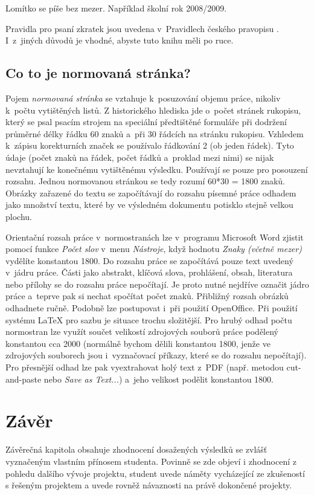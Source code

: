 Lomítko se píše bez mezer. Například školní rok 2008/2009.

Pravidla pro psaní zkratek jsou uvedena v~Pravidlech českého pravopisu \cite{Pravidla}. I~z~jiných důvodů je vhodné, abyste tuto knihu měli po ruce. 


\section{Co to je normovaná stránka?}
Pojem {\it normovaná stránka} se vztahuje k~posuzování objemu práce, nikoliv k~počtu vytištěných listů. Z historického hlediska jde o~počet stránek rukopisu, který se psal psacím strojem na speciální předtištěné formuláře při dodržení průměrné délky řádku 60 znaků a~při 30 řádcích na stránku rukopisu. Vzhledem k~zápisu korekturních značek se používalo řádkování 2 (ob jeden řádek). Tyto údaje (počet znaků na řádek, počet řádků a~proklad mezi nimi) se nijak nevztahují ke konečnému vytištěnému výsledku. Používají se pouze pro posouzení rozsahu. Jednou normovanou stránkou se tedy rozumí 60*30 = 1800 znaků. Obrázky zařazené do textu se započítávají do rozsahu písemné práce odhadem jako množství textu, které by ve výsledném dokumentu potisklo stejně velkou plochu.

Orientační rozsah práce v~normostranách lze v~programu Microsoft Word zjistit pomocí funkce {\it Počet slov} v~menu {\it Nástroje}, když hodnotu {\it Znaky (včetně mezer)} vydělíte konstantou 1800. Do rozsahu práce se započítává pouze text uvedený v~jádru práce. Části jako abstrakt, klíčová slova, prohlášení, obsah, literatura nebo přílohy se do rozsahu práce nepočítají. Je proto nutné nejdříve označit jádro práce a~teprve pak si nechat spočítat počet znaků. Přibližný rozsah obrázků odhadnete ručně. Podobně lze postupovat i~při použití OpenOffice. Při použití systému LaTeX pro sazbu je situace trochu složitější. Pro hrubý odhad počtu normostran lze využít součet velikostí zdrojových souborů práce podělený konstantou cca 2000 (normálně bychom dělili konstantou 1800, jenže ve zdrojových souborech jsou i~vyznačovací příkazy, které se do rozsahu nepočítají). Pro přesnější odhad lze pak vyextrahovat holý text z~PDF (např. metodou cut-and-paste nebo {\it Save as Text...}) a~jeho velikost podělit konstantou 1800. 


\chapter{Závěr}
Závěrečná kapitola obsahuje zhodnocení dosažených výsledků se zvlášť vyznačeným vlastním přínosem studenta. Povinně se zde objeví i zhodnocení z pohledu dalšího vývoje projektu, student uvede náměty vycházející ze zkušeností s řešeným projektem a uvede rovněž návaznosti na právě dokončené projekty.

